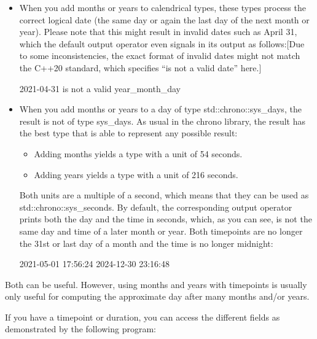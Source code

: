 \begin{itemize}
\item 
When you add months or years to calendrical types, these types process the correct logical date (the same day or again the last day of the next month or year). Please note that this might result in invalid dates such as April 31, which the default output operator even signals in its output as follows:[Due to some inconsistencies, the exact format of invalid dates might not match the C++20 standard, which specifies “is not a valid date” here.]

\begin{shell}
2021-04-31 is not a valid year_month_day
\end{shell}

\item
When you add months or years to a day of type std::chrono::sys\_days, the result is not of type sys\_days. As usual in the chrono library, the result has the best type that is able to represent any possible result:

\begin{itemize}
\item 
Adding months yields a type with a unit of 54 seconds.

\item 
Adding years yields a type with a unit of 216 seconds.
\end{itemize}

Both units are a multiple of a second, which means that they can be used as std::chrono::sys\_seconds. By default, the corresponding output operator prints both the day and the time in seconds, which, as you can see, is not the same day and time of a later month or year. Both timepoints are no longer the 31st or last day of a month and the time is no longer midnight:

\begin{shell}
2021-05-01 17:56:24
2024-12-30 23:16:48
\end{shell}

\end{itemize}

Both can be useful. However, using months and years with timepoints is usually only useful for computing the approximate day after many months and/or years.


If you have a timepoint or duration, you can access the different fields as demonstrated by the following program:

